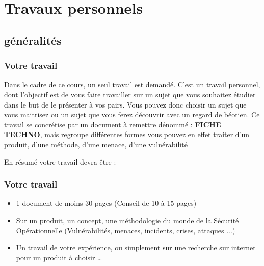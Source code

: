 %                            
%

\section{Travaux personnels}

\subsection{généralités}




\begin{frame}
\frametitle<presentation>{Votre travail}
Dans le cadre de ce cours, un seul travail  est demandé. C'est un travail personnel, dont l'objectif est de vous faire travailler sur un sujet que vous souhaitez étudier dans le but de le présenter à vos pairs. Vous pouvez donc choisir un sujet que vous maitrisez ou un sujet que vous ferez découvrir avec un regard de béotien.
Ce travail se concrétise par un document à remettre dénommé : \textbf{FICHE TECHNO}, mais regroupe différentes formes vous pouvez en effet traiter d'un produit, d'une méthode, d'une menace, d'une vulnérabilité 
\end{frame}

En résumé votre travail devra être : 

\begin{frame}
\frametitle<presentation>{Votre travail}
\begin{itemize}
  \item  1 document de moins 30 pages (Conseil de 10 à 15 pages)
  \item  Sur un produit, un concept, une méthodologie du monde de la Sécurité Opérationnelle (Vulnérabilités, menaces, incidents, crises, attaques ...)
  \item  Un travail de votre expérience, ou simplement sur une recherche sur internet pour un produit à choisir … 
\end{itemize}


\end{frame}

